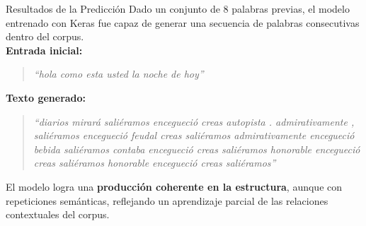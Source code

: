 \documentclass{beamer}
\begin{document}
\begin{frame}{Resultados de la Predicción}
	\small
	Dado un conjunto de 8 palabras previas, el modelo entrenado con Keras fue capaz de generar una secuencia de palabras consecutivas dentro del corpus.\\[0.5em]
	
	\textbf{Entrada inicial:}
	\begin{quote}
		\textit{``hola como esta usted la noche de hoy''}
	\end{quote}
	
	\textbf{Texto generado:}
	\begin{quote}
		\textit{``diarios mirará saliéramos encegueció creas autopista . admirativamente , saliéramos encegueció feudal creas saliéramos admirativamente encegueció bebida saliéramos contaba encegueció creas saliéramos honorable encegueció creas saliéramos honorable encegueció creas saliéramos''}
	\end{quote}
	
	\vspace{0.5em}
	El modelo logra una \textbf{producción coherente en la estructura}, aunque con repeticiones semánticas, reflejando un aprendizaje parcial de las relaciones contextuales del corpus.
\end{frame}	

	


	
	
\end{document}
